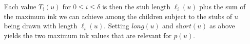 \documentclass[a4paper,english,numberwithinsect]{eurocg18}
\newcommand{\maxsped}{\ensuremath{\textsc{MaxSPED}}\xspace}
\newcommand{\sollong}{\ensuremath{\textit{long}}\xspace}
\newcommand{\solshort}{\ensuremath{\textit{short}}\xspace}
\begin{document}
Each value $ T_i(u) $ for $ 0 \leq i \leq \delta $ is then the stub length $ \ell_i(u) $ plus the sum of the maximum ink we can achieve among the children subject to the stubs of $u$ being drawn with length $\ell_i(u)$. 
Setting $ \sollong(u) $ and $ \solshort(u) $ as above yields the two maximum ink values that are relevant for $ p(u) $.
\end{document}
